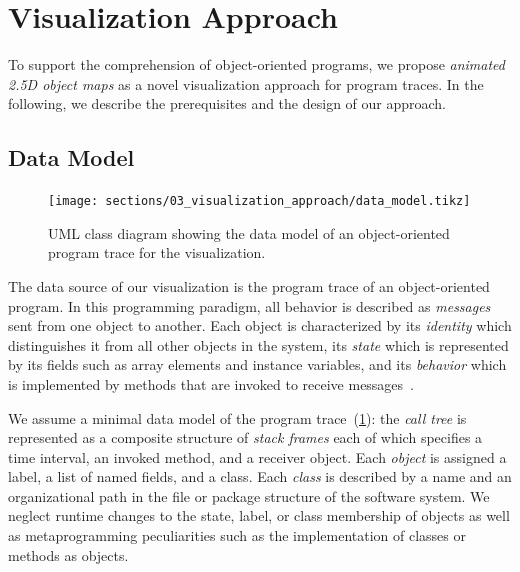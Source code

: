 \section{Visualization Approach}
\label{sec:visualization_approach}

To support the comprehension of object-oriented programs, we propose \emph{animated 2.5D object maps} as a novel visualization approach for program traces.
In the following, we describe the prerequisites and the design of our approach.

\subsection{Data Model}
\label{sec:visualization_approach/data_model}

\begin{figure}
	\texttt{[image: sections/03\_visualization\_approach/data\_model.tikz]}
	\caption{UML class diagram showing the data model of an object-oriented program trace for the visualization.}
	\label{fig:visualization_approach/data_model}
\end{figure}

The data source of our visualization is the program trace of an object-oriented program.
In this programming paradigm, all behavior is described as \emph{messages} sent from one object to another.
Each object is characterized by its \emph{identity} which distinguishes it from all other objects in the system, its \emph{state} which is represented by its fields such as array elements and instance variables, and its \emph{behavior} which is implemented by methods that are invoked to receive messages~\cite{thiede2023time}.

We assume a minimal data model of the program trace~(\cref{fig:visualization_approach/data_model}):
the \emph{call tree} is represented as a composite structure of \emph{stack frames} each of which specifies a time interval, an invoked method, and a receiver object.
Each \emph{object} is assigned a label, a list of named fields, and a class.
Each \emph{class} is described by a name and an organizational path in the file or package structure of the software system.
We neglect runtime changes to the state, label, or class membership of objects as well as metaprogramming peculiarities such as the implementation of classes or methods as objects.

